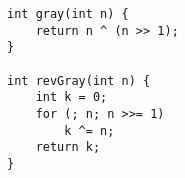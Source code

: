 \begin{verbatim}
int gray(int n) {
	return n ^ (n >> 1); 					
}

int revGray(int n) {
	int k = 0;
	for (; n; n >>= 1)
		k ^= n;
	return k;
}
\end{verbatim}

